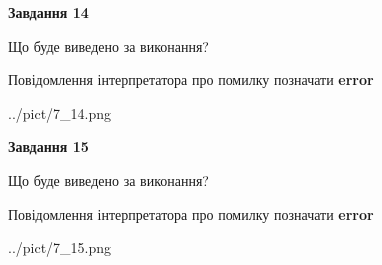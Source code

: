 \documentclass[11pt, ukrainian]{article}
\begin{document}
{\begin {large}
{\begin {center}\textbf{Завдання 14}\end {center}}\par
Що буде виведено за виконання? \par
Повідомлення інтерпретатора про помилку позначати \textbf{error}

\begin{center}
	{../pict/7_14.png}
\end{center}
\newpage

{\begin {center}\textbf{Завдання 15}\end {center}}\par
Що буде виведено за виконання? \par
Повідомлення інтерпретатора про помилку позначати \textbf{error}

\begin{center}
	{../pict/7_15.png}
\end{center}
\newpage

\end {large}}
\end{document}
